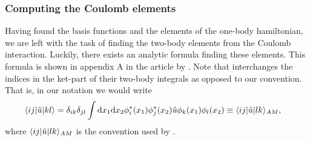         \subsubsection{Computing the Coulomb elements}
            Having found the basis functions and the elements of the one-body
            hamiltonian, we are left with the task of finding the two-body
            elements from the Coulomb interaction. Luckily, there exists an
            analytic formula finding these elements. This formula is shown in
            appendix A in the article  by
            \citeauthor{anisimovas1998energy} \cite{anisimovas1998energy}. Note
            that \citeauthor{anisimovas1998energy} interchanges the indices in
            the ket-part of their two-body integrals as opposed to our
            convention. That is, in our notation we would write
            \begin{align}
                \langle ij |\hat{u}| kl \rangle
                &= \delta_{ik}\delta_{jl}
                \int\mathrm{d} x_1\mathrm{d} x_2
                \phi_{i}^{*}(x_1) \phi_{j}^{*}(x_2)
                \hat{u}
                \phi_{k}(x_1)\phi_{l}(x_2)
                \equiv
                \langle ij |\hat{u}| lk \rangle_{AM},
            \end{align}
            where $ \langle ij |\hat{u}| lk \rangle_{AM}$ is the convention used by
            \citeauthor{anisimovas1998energy}.


